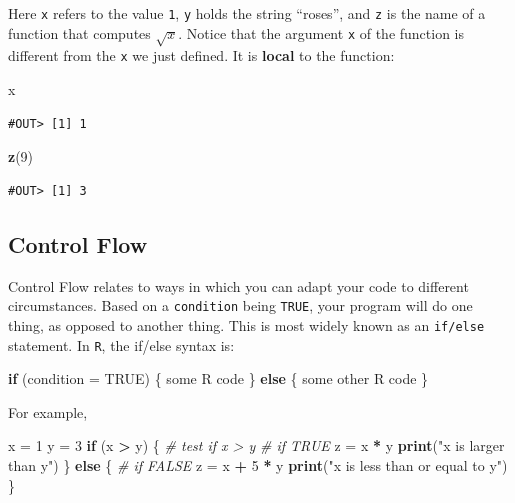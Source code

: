 \documentclass[]{book}
\newenvironment{Shaded}{\begin{snugshade}}{\end{snugshade}}
\newcommand{\KeywordTok}[1]{\textcolor[rgb]{0.13,0.29,0.53}{\textbf{#1}}}
\newcommand{\DataTypeTok}[1]{\textcolor[rgb]{0.13,0.29,0.53}{#1}}
\newcommand{\DecValTok}[1]{\textcolor[rgb]{0.00,0.00,0.81}{#1}}
\newcommand{\StringTok}[1]{\textcolor[rgb]{0.31,0.60,0.02}{#1}}
\newcommand{\CommentTok}[1]{\textcolor[rgb]{0.56,0.35,0.01}{\textit{#1}}}
\newcommand{\OtherTok}[1]{\textcolor[rgb]{0.56,0.35,0.01}{#1}}
\newcommand{\ControlFlowTok}[1]{\textcolor[rgb]{0.13,0.29,0.53}{\textbf{#1}}}
\newcommand{\OperatorTok}[1]{\textcolor[rgb]{0.81,0.36,0.00}{\textbf{#1}}}
\newcommand{\NormalTok}[1]{#1}
\theoremstyle{definition}
\theoremstyle{definition}
\theoremstyle{definition}
\theoremstyle{remark}
\begin{document}
Here \texttt{x} refers to the value \texttt{1}, \texttt{y} holds the
string ``roses'', and \texttt{z} is the name of a function that computes
\(\sqrt{x}\). Notice that the argument \texttt{x} of the function is
different from the \texttt{x} we just defined. It is \textbf{local} to
the function:

\begin{Shaded}
\begin{Highlighting}[]
\NormalTok{x}
\end{Highlighting}
\end{Shaded}

\begin{verbatim}
#OUT> [1] 1
\end{verbatim}

\begin{Shaded}
\begin{Highlighting}[]
\KeywordTok{z}\NormalTok{(}\DecValTok{9}\NormalTok{)}
\end{Highlighting}
\end{Shaded}

\begin{verbatim}
#OUT> [1] 3
\end{verbatim}

\subsection{Control Flow}\label{control-flow}

Control Flow relates to ways in which you can adapt your code to
different circumstances. Based on a \texttt{condition} being
\texttt{TRUE}, your program will do one thing, as opposed to another
thing. This is most widely known as an \texttt{if/else} statement. In
\texttt{R}, the if/else syntax is:

\begin{Shaded}
\begin{Highlighting}[]
\ControlFlowTok{if}\NormalTok{ (}\DataTypeTok{condition =} \OtherTok{TRUE}\NormalTok{) \{}
\NormalTok{  some R code}
\NormalTok{\} }\ControlFlowTok{else}\NormalTok{ \{}
\NormalTok{  some other R code}
\NormalTok{\}}
\end{Highlighting}
\end{Shaded}

For example,

\begin{Shaded}
\begin{Highlighting}[]
\NormalTok{x =}\StringTok{ }\DecValTok{1}
\NormalTok{y =}\StringTok{ }\DecValTok{3}
\ControlFlowTok{if}\NormalTok{ (x }\OperatorTok{>}\StringTok{ }\NormalTok{y) \{  }\CommentTok{# test if x > y}
  \CommentTok{# if TRUE}
\NormalTok{  z =}\StringTok{ }\NormalTok{x }\OperatorTok{*}\StringTok{ }\NormalTok{y}
  \KeywordTok{print}\NormalTok{(}\StringTok{"x is larger than y"}\NormalTok{)}
\NormalTok{\} }\ControlFlowTok{else}\NormalTok{ \{}
  \CommentTok{# if FALSE}
\NormalTok{  z =}\StringTok{ }\NormalTok{x }\OperatorTok{+}\StringTok{ }\DecValTok{5} \OperatorTok{*}\StringTok{ }\NormalTok{y}
  \KeywordTok{print}\NormalTok{(}\StringTok{"x is less than or equal to y"}\NormalTok{)}
\NormalTok{\}}
\end{Highlighting}
\end{Shaded}
\end{document}
